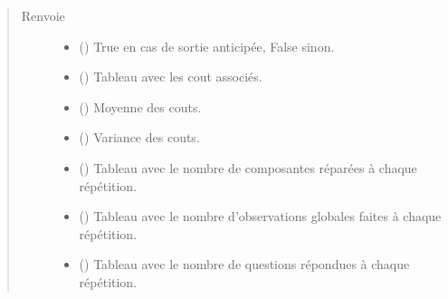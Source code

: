 \documentclass[letterpaper,10pt,french]{sphinxmanual}
\begin{document}
\begin{fulllineitems}
\begin{fulllineitems}
\begin{quote}
\begin{description}
\begin{itemize}
\end{itemize}

\item[{Renvoie}] \leavevmode
\begin{itemize}
\item {} 
 () \textendash{} True en cas de sortie anticipée, False sinon.

\item {} 
 () \textendash{} Tableau avec les cout associés.

\item {} 
 () \textendash{} Moyenne des couts.

\item {} 
 () \textendash{} Variance des couts.

\item {} 
 () \textendash{} Tableau avec le nombre de composantes réparées à chaque répétition.

\item {} 
 () \textendash{} Tableau avec le nombre d’observations globales faites à chaque
répétition.

\item {} 
 () \textendash{} Tableau avec le nombre de questions répondues à chaque répétition.

\end{itemize}


\end{description}\end{quote}

\end{fulllineitems}



\end{fulllineitems}
\end{document}
